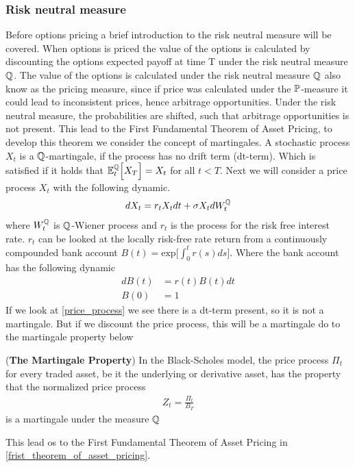\subsubsection{Risk neutral measure}
Before options pricing a brief introduction to the risk neutral measure will be covered.
When options is priced the value of the options is calculated by discounting 
the options expected payoff at time T under the risk neutral measure $\mathbb{Q}$. 
The value of the options is calculated under the risk neutral measure $\mathbb{Q}$ also know as the pricing measure, 
since if price was calculated under the $\mathbb{P}$-measure it could lead to inconsistent prices, hence arbitrage opportunities. 
Under the risk neutral measure, the probabilities are shifted, such that arbitrage opportunities is not present. This lead to 
the First Fundamental Theorem of Asset Pricing, to develop this theorem we consider the concept of martingales. 
A stochastic process $X_t$ is a $\mathbb{Q}$-martingale, if the process has no drift term (dt-term). Which is satisfied if it holds that
$\mathbb{E}_{t}^{\mathbb{Q}}\Big[X_T\Big] = X_t$ for all $t<T$. Next we will consider a price process $X_t$ with the following dynamic.
\begin{align}
    d X_t = r_t X_t dt + \sigma X_t d W_{t}^{\mathbb{Q}}
    \label{price_process}
\end{align}
where $W_{t}^{\mathbb{Q}}$ is $\mathbb{Q}$-Wiener process and  $r_t$ is the process for the risk free interest rate. $r_t$ can be looked at the locally risk-free rate return 
from a continuously compounded bank account $B(t)= \text{exp} \Big[\int_{0}^{t}r(s)ds \Big]$.
Where the bank account has the following dynamic
\begin{align*}
    dB(t) &= r(t)B(t) dt \\
    B(0) & = 1
\end{align*}
If we look at \autoref{price_process} we see there is a dt-term present, so it is not a martingale.
But if we discount the price process, this will be a martingale do to the martingale property below
\begin{proposition}
    (\textbf{The Martingale Property}) In the Black-Scholes model, the price process $\Pi_t$
    for every traded asset, be it the underlying or derivative asset, has the property that the normalized price process
    \begin{align*}
        Z_t = \frac{\Pi_t}{B_T}
    \end{align*}
    is a martingale under the measure $\mathbb{Q}$ \cite{Bjork}
\end{proposition}
\noindent 
This lead os to the First Fundamental Theorem of Asset Pricing in \autoref{frist_theorem_of_asset_pricing}.
